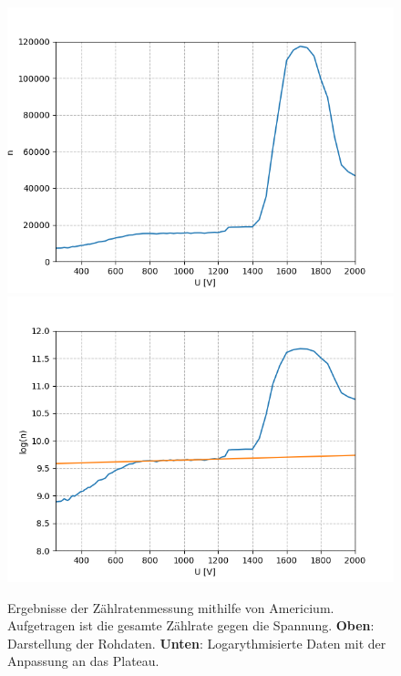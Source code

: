 \documentclass[12pt,a4paper]{article}
\begin{document}
\begin{figure}
\centering
\includegraphics[scale=0.8]{Bilder/Prop/Am_lin.PNG}
\includegraphics[scale=0.8]{Bilder/Prop/Am_log.PNG}
\caption{Ergebnisse der Zählratenmessung mithilfe von Americium. Aufgetragen ist die gesamte Zählrate gegen die Spannung. \textbf{Oben}: Darstellung der Rohdaten. \textbf{Unten}: Logarythmisierte Daten mit der Anpassung an das Plateau.}
\label{fig:amlin}
\end{figure}
\end{document}
